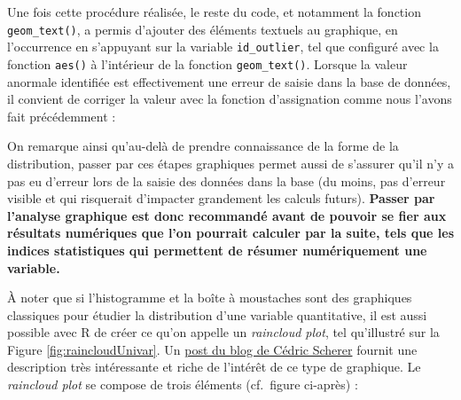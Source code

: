 \documentclass[
]{book}
\newenvironment{Shaded}{\begin{snugshade}}{\end{snugshade}}
\newcommand{\CommentTok}[1]{\textcolor[rgb]{0.56,0.35,0.01}{\textit{#1}}}
\newcommand{\DecValTok}[1]{\textcolor[rgb]{0.00,0.00,0.81}{#1}}
\newcommand{\FloatTok}[1]{\textcolor[rgb]{0.00,0.00,0.81}{#1}}
\newcommand{\NormalTok}[1]{#1}
\newcommand{\OtherTok}[1]{\textcolor[rgb]{0.56,0.35,0.01}{#1}}
\newcommand{\SpecialCharTok}[1]{\textcolor[rgb]{0.00,0.00,0.00}{#1}}
\begin{document}
Une fois cette procédure réalisée, le reste du code, et notamment la fonction \texttt{geom\_text()}, a permis d'ajouter des éléments textuels au graphique, en l'occurrence en s'appuyant sur la variable \texttt{id\_outlier}, tel que configuré avec la fonction \texttt{aes()} à l'intérieur de la fonction \texttt{geom\_text()}. Lorsque la valeur anormale identifiée est effectivement une erreur de saisie dans la base de données, il convient de corriger la valeur avec la fonction d'assignation comme nous l'avons fait précédemment :

\begin{Shaded}
\end{Shaded}

On remarque ainsi qu'au-delà de prendre connaissance de la forme de la distribution, passer par ces étapes graphiques permet aussi de s'assurer qu'il n'y a pas eu d'erreur lors de la saisie des données dans la base (du moins, pas d'erreur visible et qui risquerait d'impacter grandement les calculs futurs). \textbf{Passer par l'analyse graphique est donc recommandé avant de pouvoir se fier aux résultats numériques que l'on pourrait calculer par la suite, tels que les indices statistiques qui permettent de résumer numériquement une variable.}

À noter que si l'histogramme et la boîte à moustaches sont des graphiques classiques pour étudier la distribution d'une variable quantitative, il est aussi possible avec R de créer ce qu'on appelle un \emph{raincloud plot}, tel qu'illustré sur la Figure \ref{fig:raincloudUnivar}. Un \href{https://www.cedricscherer.com/2021/06/06/visualizing-distributions-with-raincloud-plots-and-how-to-create-them-with-ggplot2/}{post du blog de Cédric Scherer} fournit une description très intéressante et riche de l'intérêt de ce type de graphique. Le \emph{raincloud plot} se compose de trois éléments (cf.~figure ci-après) :
\end{document}
